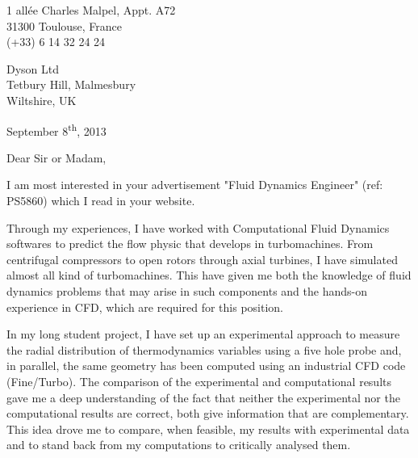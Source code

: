 \documentclass[11pt]{article}
\begin{document}
\begin{flushright}
	1 allée Charles Malpel, Appt. A72 \\
	31300 Toulouse, France \\
	(+33) 6 14 32 24 24 \\
\end{flushright}

\begin{flushleft}
Dyson Ltd \\
Tetbury Hill, Malmesbury \\
Wiltshire, UK
\end{flushleft}

\begin{flushright}
September 8\textsuperscript{th}, 2013
\end{flushright}

\noindent
Dear Sir or Madam,
\newline

\noindent
I am most interested in your advertisement "Fluid
Dynamics Engineer" (ref: PS5860) which I read in your website.
\newline

\noindent
Through my experiences, I have worked with Computational Fluid Dynamics
softwares to predict the flow physic that develops in turbomachines. From centrifugal 
compressors to open rotors through axial turbines, I have simulated 
almost all kind of turbomachines.
This have given me both the knowledge of 
fluid dynamics problems that may arise in such components and 
the hands-on experience in CFD, which are required for this position.
\newline

\noindent
In my long student project,
I have set up an experimental approach to measure the radial distribution
of thermodynamics variables using a five hole probe and, in parallel, the same
geometry has been computed using an industrial CFD code (Fine/Turbo). The comparison
of the experimental and computational results gave me a deep 
understanding of the fact that neither the experimental nor the computational
results are correct, both give information that are complementary.
This idea drove me to compare, when feasible, my results with
experimental data and to stand back from my computations to critically
analysed them.
\newline
\end{document}
